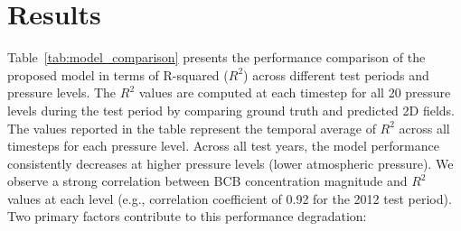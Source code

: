 \documentclass{article}
\begin{document}
\section{Results}
    Table~\ref{tab:model_comparison} presents the performance comparison of the proposed model in terms of R-squared ($R^2$) across different test periods and pressure levels. The $R^2$ values are computed at each timestep for all 20 pressure levels during the test period by comparing ground truth and predicted 2D fields. The values reported in the table represent the temporal average of $R^2$ across all timesteps for each pressure level. Across all test years, the model performance consistently decreases at higher pressure levels (lower atmospheric pressure). We observe a strong correlation between BCB concentration magnitude and $R^2$ values at each level (e.g., correlation coefficient of 0.92 for the 2012 test period). Two primary factors contribute to this performance degradation:
\end{document}
